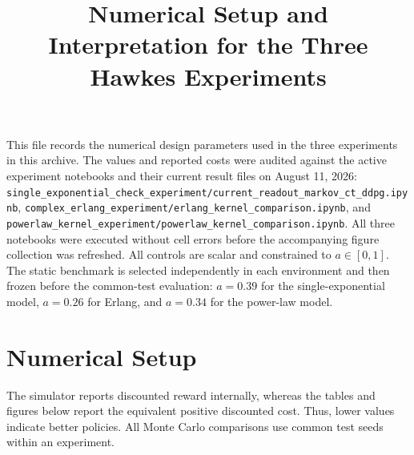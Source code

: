 \documentclass[11pt]{article}
\title{Numerical Setup and Interpretation for the Three Hawkes Experiments}
\author{}
\date{}
\newcommand{\code}[1]{\texttt{#1}}
\begin{document}
\maketitle

This file records the numerical design parameters used in the three experiments
in this archive. The values and
reported costs were audited against the active experiment notebooks and their
current result files on August 11, 2026:
\code{single\_exponential\_check\_experiment/current\_readout\_markov\_ct\_ddpg.ipynb},
\code{complex\_erlang\_experiment/erlang\_kernel\_comparison.ipynb}, and
\code{powerlaw\_kernel\_experiment/powerlaw\_kernel\_comparison.ipynb}.
All three notebooks were executed without cell errors before the accompanying
figure collection was refreshed. All controls are scalar and constrained to
\(a\in[0,1]\). The static benchmark is selected independently in each
environment and then frozen before the common-test evaluation: \(a=0.39\) for
the single-exponential model, \(a=0.26\) for Erlang, and \(a=0.34\) for the
power-law model.

\section{Numerical Setup}

The simulator reports discounted reward internally, whereas the tables and
figures below report the equivalent positive discounted cost. Thus, lower
values indicate better policies. All Monte Carlo comparisons use common test
seeds within an experiment.
\end{document}
